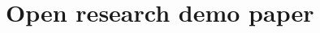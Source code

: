 \documentclass{article}
\begin{document}
\section*{Open research demo paper}
\blindtext
\end{document}

